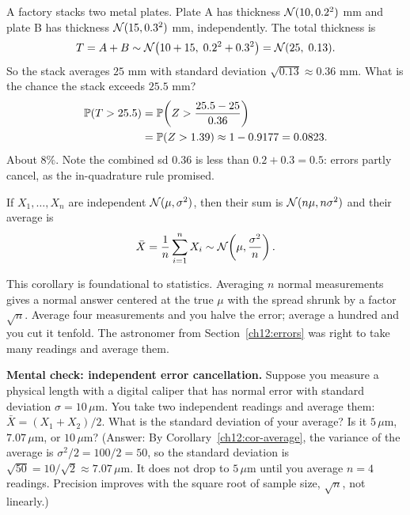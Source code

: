\begin{example}
\label{ch12:ex-stack}
A factory stacks two metal plates. Plate A has thickness $\Normal(10, 0.2^2)$ mm
and plate B has thickness $\Normal(15, 0.3^2)$ mm, independently. The total
thickness is
\[
  T = A + B \sim \Normal\big(10+15,\; 0.2^2 + 0.3^2\big) = \Normal(25,\; 0.13).
\]
So the stack averages $25$ mm with standard deviation $\sqrt{0.13}\approx 0.36$ mm.
What is the chance the stack exceeds $25.5$ mm?
\begin{align*}
  \P(T > 25.5) &= \P\!\left(Z > \frac{25.5 - 25}{0.36}\right) \\
               &= \P(Z > 1.39) \approx 1 - 0.9177 = 0.0823.
\end{align*}
About $8\%$. Note the combined sd $0.36$ is less than $0.2 + 0.3 = 0.5$: errors
partly cancel, as the in-quadrature rule promised.
\end{example}

\begin{corollary}
\label{ch12:cor-average}
If $X_1,\dots,X_n$ are independent $\Normal(\mu,\sigma^2)$, then their sum is
$\Normal(n\mu, n\sigma^2)$ and their average is
\[
  \bar X = \frac{1}{n}\sum_{i=1}^n X_i \sim \Normal\!\left(\mu, \frac{\sigma^2}{n}\right).
\]
\end{corollary}

This corollary is foundational to statistics. Averaging $n$ normal
measurements gives a normal answer centered at the true $\mu$ with the spread
shrunk by a factor $\sqrt{n}$. Average four measurements and you halve the error;
average a hundred and you cut it tenfold. The astronomer from
Section~\ref{ch12:errors} was right to take many readings and average them.

\begin{walkbox}
\textbf{Mental check: independent error cancellation.}
Suppose you measure a physical length with a digital caliper that has normal
error with standard deviation $\sigma = 10\,\mu\text{m}$. You take two
independent readings and average them: $\bar X = (X_1 + X_2)/2$. What is the
standard deviation of your average? Is it $5\,\mu\text{m}$,
$7.07\,\mu\text{m}$, or $10\,\mu\text{m}$? (Answer: By
Corollary~\ref{ch12:cor-average}, the variance of the average is $\sigma^2/2 =
100/2 = 50$, so the standard deviation is $\sqrt{50} = 10/\sqrt{2} \approx
7.07\,\mu\text{m}$. It does not drop to $5\,\mu\text{m}$ until you average
$n=4$ readings. Precision improves with the square root of sample size,
$\sqrt{n}$, not linearly.)
\end{walkbox}

